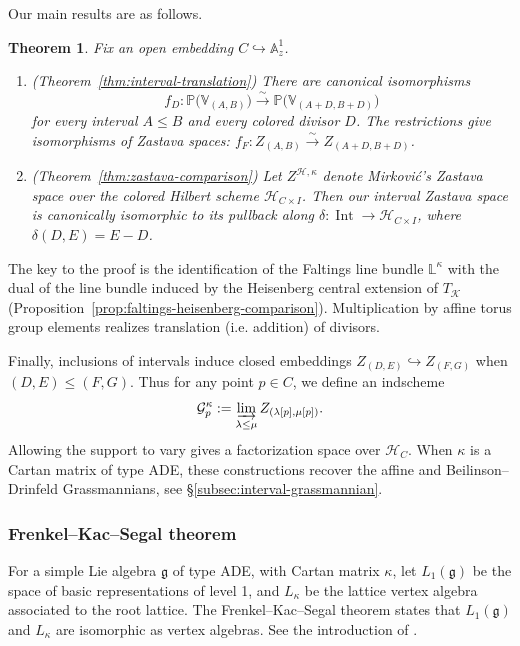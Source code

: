 \documentclass{amsart}
\numberwithin{equation}{section}
\numberwithin{figure}{section}
\newtheorem{thm}{Theorem}[section]
\theoremstyle{definition}
\theoremstyle{remark}
\begin{document}
Our main results are as follows.
\begin{thm}
Fix an open embedding $C\hookrightarrow\mathbb A^1_z$. 
\begin{enumerate}
\item(Theorem~\ref{thm:interval-translation})
There are canonical isomorphisms
\[
f_D:\mathbb P\bigl(\mathbb V_{(A,B)}\bigr)
\xrightarrow{\sim}
\mathbb P\bigl(\mathbb V_{(A+D,B+D)}\bigr)
\]
for every interval $A\leq B$ and every colored divisor $D$.
The restrictions give isomorphisms of Zastava spaces: $f_F:Z_{(A,B)}\xrightarrow{\sim}Z_{(A+D,B+D)}$.
\item(Theorem~\ref{thm:zastava-comparison}) 
Let \(Z^{\mathcal H,\kappa}\) denote Mirković’s Zastava space over the colored Hilbert scheme \(\mathcal H_{C\times I}\). Then our interval Zastava space is canonically isomorphic to its pullback along \(\delta:\operatorname{Int}\to\mathcal H_{C\times I}\), where \(\delta(D,E)=E-D\).
\end{enumerate}



\end{thm}

The key to the proof is the identification of the Faltings line bundle
$\mathbb L^\kappa$ with the dual of the line bundle induced by the Heisenberg central extension of \(T_{\mathcal K}\)
(Proposition~\ref{prop:faltings-heisenberg-comparison}).
Multiplication by affine torus group elements realizes translation (i.e. addition) of divisors. 

Finally, inclusions of intervals induce closed embeddings
$Z_{(D,E)}\hookrightarrow Z_{(F,G)}$ when
$(D,E)\le(F,G)$. Thus for any point $p\in C$, we define an indscheme
\[
\mathcal G^\kappa_p
:=\varinjlim_{\lambda\leq\mu}
Z_{(\lambda[p],\mu[p])}.
\]
Allowing the support to vary gives a factorization space over
$\mathcal H_C$. When $\kappa$ is a Cartan matrix of type ADE,
these constructions recover the affine and 
Beilinson--Drinfeld Grassmannians, see \S\ref{subsec:interval-grassmannian}.
\subsubsection{Frenkel--Kac--Segal theorem}

For a simple Lie algebra $\mathfrak g$ of type ADE,
with Cartan matrix $\kappa$, let $L_1(\mathfrak g)$ be the space of basic representations of level 1, and  $L_\kappa$ be the lattice vertex algebra associated to the root lattice.  The Frenkel--Kac--Segal theorem 
\cite{frenkel1980basic,segal1981unitary} states that 
$L_1(\mathfrak g)$ and $ L_\kappa$ are isomorphic as vertex algebras. See the introduction of \cite{zhu2009affine}.
\end{document}
